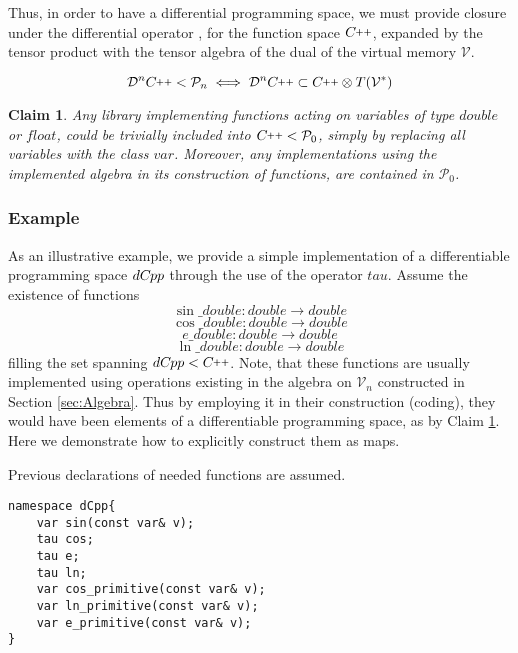 \documentclass{article}
\newcommand{\VV}{\mathcal{V}}
\newcommand{\CC}{C\nolinebreak\hspace{-.05em}\raisebox{.4ex}{\tiny\bf +}\nolinebreak\hspace{-.10em}\raisebox{.4ex}{\tiny\bf +}}
\def\CC{{C\nolinebreak[4]\hspace{-.05em}\raisebox{.4ex}{\tiny\bf ++}}}
\newcommand{\dP}{\mathcal{P}}
\newcommand{\DD}{\mathcal{D}}
\newcommand{\dCpp}{dC\nolinebreak\hspace{-.05em}\raisebox{.4ex}{\tiny\bf +}\nolinebreak\hspace{-.10em}\raisebox{.4ex}{\tiny\bf p}}
\def\dCpp{{dC\nolinebreak[4]\hspace{-.05em}pp}}
\newtheorem{trditev}{Claim}[section]
\begin{document}
              Thus, in order to have a differential programming space, we must provide closure under the differential operator \cite[Corollary~5.1]{OperationalCalculus}, for the function space $\CC$, expanded by the tensor product with the tensor algebra of the dual of the virtual memory $\VV$.
              
              \begin{equation}
              \DD^n\CC<\dP_n\iff\DD^n\CC\subset\CC\otimes T(\VV^*)
              \end{equation}

\begin{trditev}\label{trd:library}
Any library implementing functions acting on variables of type $double$ or $float$, could be trivially included into $\CC<\dP_0$, simply by replacing all variables with the class $var$. Moreover, any implementations using the implemented algebra in its construction of functions, are contained in $\dP_0$.
\end{trditev}

\subsubsection{Example}
  
As an illustrative example, we provide a simple implementation of a differentiable programming space $\dCpp$ through the use of the operator $tau$. 
Assume the existence of functions
\begin{equation}
\sin\_double:double\to double
\end{equation}
\begin{equation}
\cos\_double:double\to double
\end{equation} 
\begin{equation}
e\_double:double\to double
\end{equation}  
\begin{equation}
\ln\_double:double\to double
\end{equation} 
filling the set spanning $\dCpp<\CC$. Note, that these functions are usually implemented using operations existing in the algebra on $\VV_n$ constructed in Section \ref{sec:Algebra}. Thus by employing it in their construction (coding), they would have been elements of a differentiable programming space, as by Claim \ref{trd:library}. Here we demonstrate how to explicitly construct them as maps.

Previous declarations of needed functions are assumed. 

\begin{lstlisting}
namespace dCpp{
    var sin(const var& v);
    tau cos;
    tau e;
    tau ln;
    var cos_primitive(const var& v);
    var ln_primitive(const var& v);
    var e_primitive(const var& v);
}
\end{lstlisting}
\end{document}
